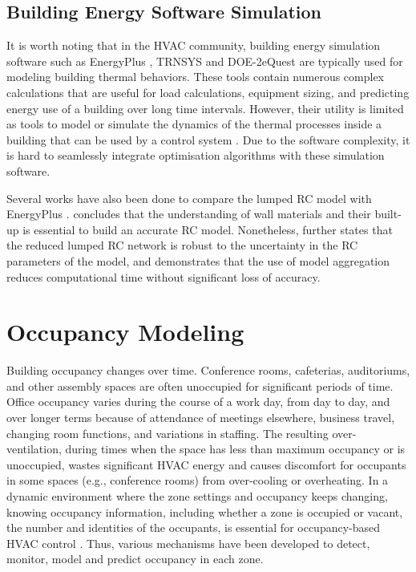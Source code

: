 \subsection{Building Energy Software Simulation}

It is worth noting that in the HVAC community, building energy simulation software such as EnergyPlus \citep{crawley2000energyplus}, TRNSYS \citep{university2010trnsys} and DOE-2\/eQuest \citep{hirsch2010equest} are typically used for modeling building thermal behaviors. These tools contain numerous complex calculations that are useful for load calculations, equipment sizing, and predicting energy use of a building over long time intervals. However, their utility is limited as tools to model or simulate the dynamics of the thermal processes inside a building that can be used by a control system \citep{goyal2011identification}. Due to the software complexity, it is hard to seamlessly integrate optimisation algorithms with these simulation software.

Several works have also been done to compare the lumped RC model with EnergyPlus \citep{sturzenegger2012semi,dobbs2012automatic,eisenhower2012uncertainty}. \citep{sturzenegger2012semi} concludes that the understanding of wall materials and their built-up is essential to build an accurate RC model. Nonetheless, \citep{eisenhower2012uncertainty} further states that the reduced lumped RC network is robust to the uncertainty in the RC parameters of the model, and \citep{dobbs2012automatic} demonstrates that the use of model aggregation reduces computational time without significant loss of accuracy.


\section{Occupancy Modeling} \label{cha:bg:occ} 

Building occupancy changes over time. 
Conference rooms, cafeterias, auditoriums, and other assembly spaces are often unoccupied for significant periods of time. Office occupancy varies during the course of a work day, from day to day, and over longer terms because of attendance of meetings elsewhere, business travel, changing room functions, and variations in staffing. The resulting over-ventilation,
during times when the space has less than maximum occupancy or is unoccupied, wastes significant HVAC energy and causes discomfort for occupants in some spaces (e.g., conference rooms) from over-cooling or overheating. In a dynamic environment where the zone settings and occupancy keeps changing, knowing occupancy information, including whether a zone is occupied or vacant, the number and identities of the occupants, is essential for occupancy-based HVAC control \citep{erickson2010occupancy,nguyen2013energy}. Thus, various mechanisms have been developed to detect, monitor, model and predict occupancy in each zone. 

